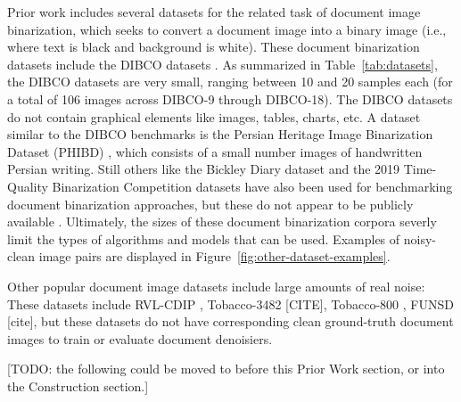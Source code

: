 \documentclass[runningheads]{llncs}
\begin{document}
Prior work includes several datasets for the related task of document image binarization, which seeks to convert a document image into a binary image (i.e., where text is black and background is white).
These document binarization datasets include the DIBCO datasets \cite{dibco-09,dibco-10,dibco-11,dibco-12,dibco-13,dibco-14,dibco-16,dibco-17,dibco-18}.
As summarized in Table~\ref{tab:datasets}, the DIBCO datasets are very small, ranging between 10 and 20 samples each (for a total of 106 images across DIBCO-9 through DIBCO-18).
The DIBCO datasets do not contain graphical elements like images, tables, charts, etc.
A dataset similar to the DIBCO benchmarks is the Persian Heritage Image Binarization Dataset (PHIBD) \cite{phibc-2012-nafchi,nafchi-2013-icdar}, which consists of a small number images of handwritten Persian writing.
Still others like the Bickley Diary dataset \cite{bickley-diary} and the 2019 Time-Quality Binarization Competition datasets \cite{2019-time-quality-competition} have also been used for benchmarking document binarization approaches, but these do not appear to be publicly available \cite{tensmeyer-binarization-review-2020}.
Ultimately, the sizes of these document binarization corpora severly limit the types of algorithms and models that can be used.
Examples of noisy-clean image pairs are displayed in Figure~\ref{fig:other-dataset-examples}.

Other popular document image datasets include large amounts of real noise: These datasets include RVL-CDIP \cite{ref_RVL-CDIP}, Tobacco-3482 [CITE], Tobacco-800 \cite{ref_Tobacco800}, FUNSD [cite], but these datasets do not have corresponding clean ground-truth document images to train or evaluate document denoisiers.

[TODO: the following could be moved to before this Prior Work section, or into the Construction section.]

\end{document}
